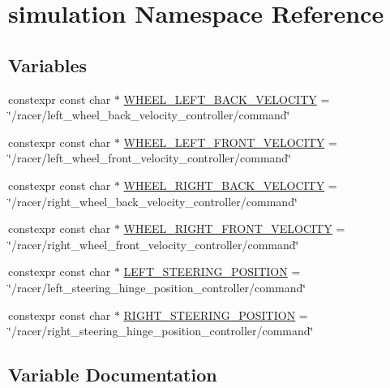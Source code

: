 \hypertarget{namespacesimulation}{}\section{simulation Namespace Reference}
\label{namespacesimulation}
\subsection*{Variables}
\begin{DoxyCompactItemize}
\item 
constexpr const char $\ast$ \hyperlink{namespacesimulation_a7a04e98990d834217946c9be604088ee}{W\+H\+E\+E\+L\+\_\+\+L\+E\+F\+T\+\_\+\+B\+A\+C\+K\+\_\+\+V\+E\+L\+O\+C\+I\+TY} = \char`\"{}/racer/left\+\_\+wheel\+\_\+back\+\_\+velocity\+\_\+controller/command\char`\"{}
\item 
constexpr const char $\ast$ \hyperlink{namespacesimulation_a84bf4fa7350ff11e42c56e6e1cf3838f}{W\+H\+E\+E\+L\+\_\+\+L\+E\+F\+T\+\_\+\+F\+R\+O\+N\+T\+\_\+\+V\+E\+L\+O\+C\+I\+TY} = \char`\"{}/racer/left\+\_\+wheel\+\_\+front\+\_\+velocity\+\_\+controller/command\char`\"{}
\item 
constexpr const char $\ast$ \hyperlink{namespacesimulation_a9b9a90d860017663afa773f15612b44e}{W\+H\+E\+E\+L\+\_\+\+R\+I\+G\+H\+T\+\_\+\+B\+A\+C\+K\+\_\+\+V\+E\+L\+O\+C\+I\+TY} = \char`\"{}/racer/right\+\_\+wheel\+\_\+back\+\_\+velocity\+\_\+controller/command\char`\"{}
\item 
constexpr const char $\ast$ \hyperlink{namespacesimulation_aad00b40febd3e9442560a15cd5204a46}{W\+H\+E\+E\+L\+\_\+\+R\+I\+G\+H\+T\+\_\+\+F\+R\+O\+N\+T\+\_\+\+V\+E\+L\+O\+C\+I\+TY} = \char`\"{}/racer/right\+\_\+wheel\+\_\+front\+\_\+velocity\+\_\+controller/command\char`\"{}
\item 
constexpr const char $\ast$ \hyperlink{namespacesimulation_aeabd7d3863831a7fc50ce8728ca46885}{L\+E\+F\+T\+\_\+\+S\+T\+E\+E\+R\+I\+N\+G\+\_\+\+P\+O\+S\+I\+T\+I\+ON} = \char`\"{}/racer/left\+\_\+steering\+\_\+hinge\+\_\+position\+\_\+controller/command\char`\"{}
\item 
constexpr const char $\ast$ \hyperlink{namespacesimulation_af34d70ba82e8343343521a32e5f6b12a}{R\+I\+G\+H\+T\+\_\+\+S\+T\+E\+E\+R\+I\+N\+G\+\_\+\+P\+O\+S\+I\+T\+I\+ON} = \char`\"{}/racer/right\+\_\+steering\+\_\+hinge\+\_\+position\+\_\+controller/command\char`\"{}
\end{DoxyCompactItemize}


\subsection{Variable Documentation}
